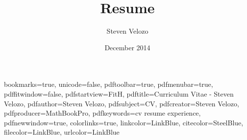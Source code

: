 
\usepackage{amsmath}

\usepackage{graphicx}
\graphicspath{{graphics/}}

\title{Resume}
\author[Steven Velozo]{Steven Velozo}
\date{December 2014}
\newcommand{\displayaddress}{\marginnote[0.9cm]{\raggedleft{\href{mailto:steven@velozo.com}{steven@velozo.com}\\(206) 604-4981 }}}
\usepackage[english]{babel}
\usepackage{booktabs}
\usepackage{units}
\usepackage{fancyvrb}

\usepackage{multicol}

\usepackage{rotating}
\usepackage{tikz}
\usetikzlibrary{arrows,backgrounds,snakes}


\newcommand{\mhstandout}[1]{\textbf{\textcolor{DarkGray}{#1}}}
\newcommand{\shstandout}[1]{\textbf{\textcolor{BurntOrange}{#1}}}
\newcommand{\shyears}[1]{\small{\texttt{\textcolor{LightGray}{#1}}}}
\newcommand{\pstandout}[1]{\textcolor{BrightRed}{#1}}
\newcommand{\competency}[1]{\textcolor{BrightRed}{#1}}

\hypersetup
{
    bookmarks=true,         %
    unicode=false,          %
    pdftoolbar=true,        %
    pdfmenubar=true,        %
    pdffitwindow=false,     %
    pdfstartview={FitH},    %
    pdftitle={Curriculum Vitae - Steven Velozo},    %
    pdfauthor={Steven Velozo},     %
    pdfsubject={CV},   %
    pdfcreator={Steven Velozo},   %
    pdfproducer={MathBookPro}, %
    pdfkeywords={cv} {resume} {experience}, %
    pdfnewwindow=true,      %
    colorlinks=true,       %
    linkcolor=LinkBlue,          %
    citecolor=SteelBlue,        %
    filecolor=LinkBlue,      %
    urlcolor=LinkBlue           %
}

\makeatletter
\newlength{\fullpagewidth}
\AtBeginDocument{\setlength{\fullpagewidth}{\@tufte@fullwidth}}
\makeatother

\newcommand{\fullwidthmode}[1]{\noindent\begin{minipage}{\fullpagewidth}#1\end{minipage}}
